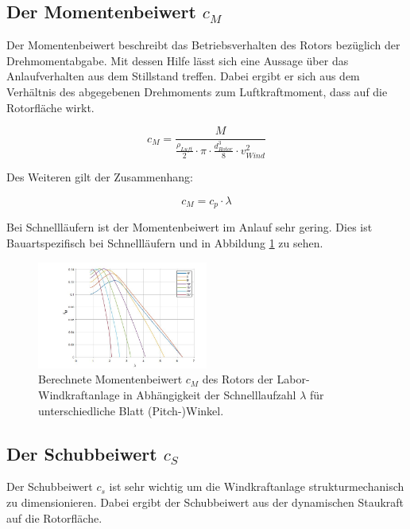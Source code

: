 \subsection{Der Momentenbeiwert \texorpdfstring{$c_M$}{}}

Der Momentenbeiwert beschreibt das Betriebsverhalten des Rotors bezüglich der Drehmomentabgabe. Mit dessen Hilfe lässt sich eine Aussage über das Anlaufverhalten aus dem Stillstand treffen. Dabei ergibt er sich aus dem Verhältnis des abgegebenen Drehmoments zum Luftkraftmoment, dass auf die Rotorfläche wirkt.

\begin{equation}
  c_{M}= \frac{M}{ \frac{\rho_{Luft}}{2}\cdot \pi \cdot \frac{d^3_{Rotor}}{8} \cdot v^2_{Wind} }
    \label{eq:Momentenbeiwert_cm}
\end{equation}

Des Weiteren gilt der Zusammenhang:

\begin{equation}
  c_{M}= c_{p} \cdot \lambda
    \label{eq:Momentenbeiwert_cm2}
\end{equation}

Bei Schnellläufern ist der Momentenbeiwert im Anlauf sehr gering. Dies ist Bauartspezifisch bei Schnellläufern und in Abbildung \ref{fig:cmzulambda} zu sehen.

\begin{figure}[h!]
    \centering
    \includegraphics[width=0.5\textwidth]{Abbildungen/cm.jpg}
    \caption{Berechnete Momentenbeiwert $c_{M}$ des Rotors der Labor-Windkraftanlage in Abhängigkeit der Schnelllaufzahl $\lambda$ für unterschiedliche Blatt (Pitch-)Winkel.\cite{Anleitung} }
    \label{fig:cmzulambda}
\end{figure}

\subsection{Der Schubbeiwert \texorpdfstring{$c_S$}{}}

Der Schubbeiwert $c_{s}$ ist sehr wichtig um die Windkraftanlage strukturmechanisch zu dimensionieren.  Dabei ergibt der Schubbeiwert aus der dynamischen Staukraft auf die Rotorfläche.

